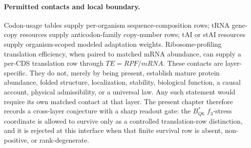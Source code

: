 \paragraph{Permitted contacts and local boundary.}
Codon-usage tables supply per-organism sequence-composition rows; tRNA gene-copy resources supply anticodon-family copy-number rows; tAI or stAI resources supply organism-scoped modeled adaptation weights. Ribosome-profiling translation efficiency, when paired to matched mRNA abundance, can supply a per-CDS translation row through $TE=RPF/mRNA$. These contacts are layer-specific. They do not, merely by being present, establish mature protein abundance, folded structure, localization, stability, biological function, a causal account, physical admissibility, or a universal law. Any such statement would require its own matched contact at that layer. The present chapter therefore records a cross-layer conjecture with a sharp readout gate: the $B^{*}_{Q6}$ $f_3$-stress coordinate is allowed to survive only as a controlled translation-row distinction, and it is rejected at this interface when that finite survival row is absent, non-positive, or rank-degenerate.
